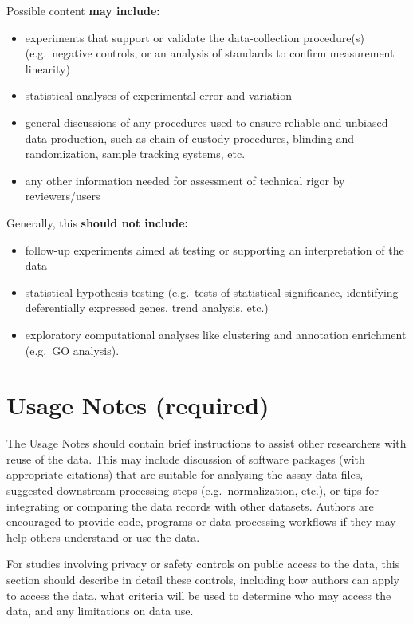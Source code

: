 \documentclass[
]{article}
\providecommand{\tightlist}{%
  \setlength{\itemsep}{0pt}\setlength{\parskip}{0pt}}
\begin{document}
Possible content \textbf{may include:}

\begin{itemize}
\tightlist
\item
  experiments that support or validate the data-collection procedure(s)
  (e.g.~negative controls, or an analysis of standards to confirm
  measurement linearity)
\item
  statistical analyses of experimental error and variation
\item
  general discussions of any procedures used to ensure reliable and
  unbiased data production, such as chain of custody procedures,
  blinding and randomization, sample tracking systems, etc.
\item
  any other information needed for assessment of technical rigor by
  reviewers/users
\end{itemize}

Generally, this \textbf{should not include:}

\begin{itemize}
\tightlist
\item
  follow-up experiments aimed at testing or supporting an interpretation
  of the data
\item
  statistical hypothesis testing (e.g.~tests of statistical
  significance, identifying deferentially expressed genes, trend
  analysis, etc.)
\item
  exploratory computational analyses like clustering and annotation
  enrichment (e.g.~GO analysis).
\end{itemize}

\hypertarget{usage-notes-required}{%
\section{Usage Notes (required)}\label{usage-notes-required}}

The Usage Notes should contain brief instructions to assist other
researchers with reuse of the data. This may include discussion of
software packages (with appropriate citations) that are suitable for
analysing the assay data files, suggested downstream processing steps
(e.g.~normalization, etc.), or tips for integrating or comparing the
data records with other datasets. Authors are encouraged to provide
code, programs or data-processing workflows if they may help others
understand or use the data.

For studies involving privacy or safety controls on public access to the
data, this section should describe in detail these controls, including
how authors can apply to access the data, what criteria will be used to
determine who may access the data, and any limitations on data use.
\end{document}
